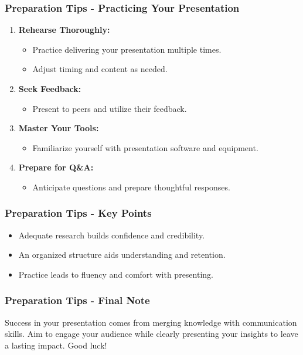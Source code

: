 \documentclass[aspectratio=169]{beamer}
\begin{document}
\begin{frame}[fragile]
    \frametitle{Preparation Tips - Practicing Your Presentation}
    \begin{enumerate}
        \item \textbf{Rehearse Thoroughly:}
            \begin{itemize}
                \item Practice delivering your presentation multiple times.
                \item Adjust timing and content as needed.
            \end{itemize}

        \item \textbf{Seek Feedback:}
            \begin{itemize}
                \item Present to peers and utilize their feedback.
            \end{itemize}

        \item \textbf{Master Your Tools:}
            \begin{itemize}
                \item Familiarize yourself with presentation software and equipment.
            \end{itemize}

        \item \textbf{Prepare for Q\&A:}
            \begin{itemize}
                \item Anticipate questions and prepare thoughtful responses.
            \end{itemize}
    \end{enumerate}
\end{frame}

\begin{frame}[fragile]
    \frametitle{Preparation Tips - Key Points}
    \begin{itemize}
        \item Adequate research builds confidence and credibility.
        \item An organized structure aids understanding and retention.
        \item Practice leads to fluency and comfort with presenting.
    \end{itemize}
\end{frame}

\begin{frame}[fragile]
    \frametitle{Preparation Tips - Final Note}
    Success in your presentation comes from merging knowledge with communication skills. 
    Aim to engage your audience while clearly presenting your insights to leave a lasting impact. Good luck!
\end{frame}
\end{document}
